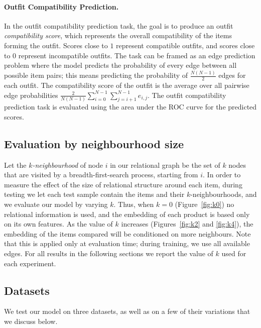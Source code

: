 \documentclass[10pt,twocolumn,letterpaper]{article}
\begin{document}
\paragraph{Outfit Compatibility Prediction.}
\label{sssec:compat}
In the outfit compatibility prediction task, the goal is to produce an outfit \emph{compatibility score}, which represents the overall compatibility of the items forming the outfit. Scores close to $1$ represent compatible outfits, and scores close to $0$ represent incompatible outfits. The task can be framed as an edge prediction problem where the model predicts the probability of every edge between all possible item pairs; this means predicting the probability of ${\frac{N(N-1)}{2}}$ edges for each outfit. The compatibility score of the outfit is the average over all pairwise edge probabilities $\frac{2}{N(N-1)} \sum\limits_{i=0}^{N-1} \sum\limits_{j=i+1}^{N-1} e_{i,j}$.
The outfit compatibility prediction task is evaluated using the area under the ROC curve for the predicted scores.





\subsection{Evaluation by neighbourhood size}
\label{ssec:evaluation}
Let the \emph{$k$-neighbourhood} of node $i$ in our relational graph be the set of $k$ nodes that are visited by a breadth-first-search process, starting from $i$. In order to measure the effect of the size of relational structure around each item, during testing we let each test sample contain the items and their $k$-neighbourhoods, and we evaluate our model by varying $k$.
Thus, when $k=0$ (Figure~\ref{fig:k0}) no relational information is used, and the embedding of each product is based only on its own features. As the value of $k$ increases (Figures~\ref{fig:k2} and \ref{fig:k4}), the embedding of the items compared will be conditioned on more neighbours. 
Note that this is applied only at evaluation time; during training, we use all available edges. For all results in the following sections we report the value of $k$ used for each experiment.

\subsection{Datasets}
\label{ssec:datasets}
We test our model on three datasets, as well as on a few of their variations that we discuss below.
\end{document}
